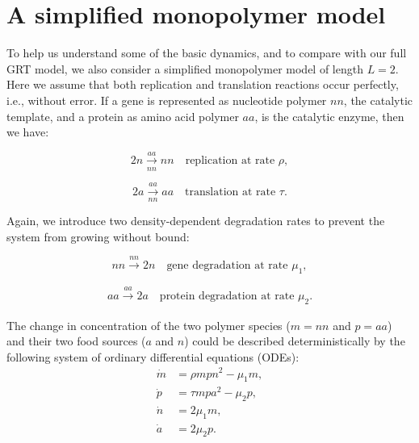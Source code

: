 \documentclass{article}
\begin{document}
\section{A simplified monopolymer model}

To help us understand some of the basic dynamics, and to compare with our full GRT model, we also consider a simplified monopolymer model of length $L=2$. 
Here we assume that both replication and translation reactions occur perfectly, i.e., without error.  %
If a gene is represented as nucleotide polymer $nn$, the catalytic template, and a protein as amino acid polymer $aa$, is the catalytic enzyme, then we have:

\begin{equation}
2n \xrightarrow[nn]{aa} nn\quad \text{replication at rate } \rho,
\label{eq:simplifiedRep}
\end{equation}

\begin{equation}
2a \xrightarrow[nn]{aa} aa\quad \text{translation at rate } \tau.
\label{eq:simplifiedTranslation}
\end{equation}

Again, we introduce two density-dependent degradation rates to prevent the system from growing without bound:

\begin{equation}
nn \xrightarrow[]{nn} 2n\quad \text{gene degradation at rate } \mu_1,
\label{eq:simplifiedRep}
\end{equation}

\begin{equation}
aa \xrightarrow[]{aa} 2a\quad \text{protein degradation at rate } \mu_2.
\label{eq:simplifiedTranslation}
\end{equation}

The change in concentration of the two polymer species ($m=nn$ and $p=aa$) and their two food sources ($a$ and $n$) could be described deterministically by the following system of ordinary differential equations (ODEs):
\begin{align}
\dot{m} &= \rho mpn^2 - \mu_1 m, \\
\dot{p} &= \tau mpa^2 - \mu_2 p, \\
\dot{n} &= 2\mu_1m,\\
\dot{a} &= 2\mu_2p.
\end{align}
\end{document}
